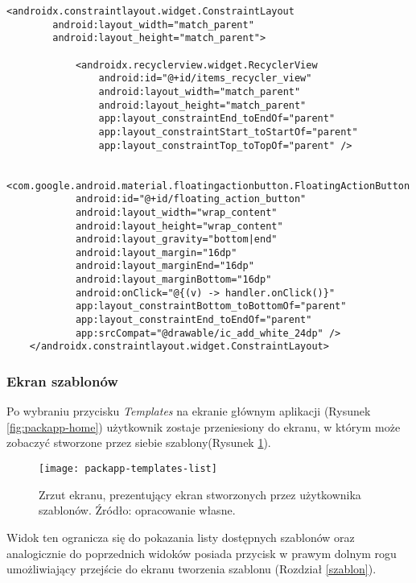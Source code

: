 \documentclass[a4paper,12pt]{article}
\begin{document}
\begin{lstlisting}[caption=Fragment widoku ekranu przedmiotów dostępnych w bazie danych pokazujący wyświetlanie nazwy przedmiotu (reszta pól wyświetalana jest analogicznie), label={lst:items-list-layout}]
    <androidx.constraintlayout.widget.ConstraintLayout
        android:layout_width="match_parent"
        android:layout_height="match_parent">

            <androidx.recyclerview.widget.RecyclerView
                android:id="@+id/items_recycler_view"
                android:layout_width="match_parent"
                android:layout_height="match_parent"
                app:layout_constraintEnd_toEndOf="parent"
                app:layout_constraintStart_toStartOf="parent"
                app:layout_constraintTop_toTopOf="parent" />

        <com.google.android.material.floatingactionbutton.FloatingActionButton
            android:id="@+id/floating_action_button"
            android:layout_width="wrap_content"
            android:layout_height="wrap_content"
            android:layout_gravity="bottom|end"
            android:layout_margin="16dp"
            android:layout_marginEnd="16dp"
            android:layout_marginBottom="16dp"
            android:onClick="@{(v) -> handler.onClick()}"
            app:layout_constraintBottom_toBottomOf="parent"
            app:layout_constraintEnd_toEndOf="parent"
            app:srcCompat="@drawable/ic_add_white_24dp" />
    </androidx.constraintlayout.widget.ConstraintLayout>
\end{lstlisting}


\subsubsection{Ekran szablonów}

Po wybraniu przycisku \textit{Templates} na ekranie głównym aplikacji (Rysunek \ref{fig:packapp-home}) użytkownik zostaje przeniesiony do ekranu, w którym może zobaczyć stworzone przez siebie szablony(Rysunek \ref{fig:packapp-templates-list}). 

\begin{figure}[H]
    \centering
    \texttt{[image: packapp-templates-list]}
    \caption{Zrzut ekranu, prezentujący ekran stworzonych przez użytkownika szablonów. Źródło: opracowanie własne.}
    \label{fig:packapp-templates-list}
\end{figure}

Widok ten ogranicza się do pokazania listy dostępnych szablonów oraz analogicznie do poprzednich widoków posiada przycisk w prawym dolnym rogu umożliwiający przejście do ekranu tworzenia szablonu (Rozdział \ref{szablon}).
\end{document}

